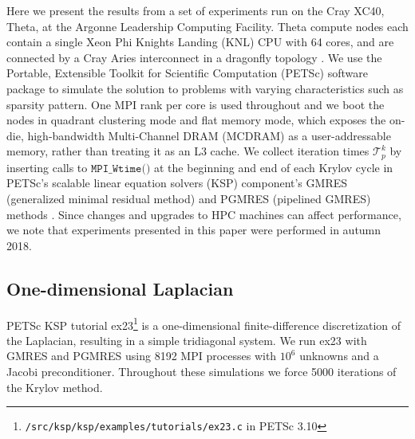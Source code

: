 \documentclass[sigconf]{acmart}
\begin{document}
Here we present the results from a set of experiments run on the Cray XC40, Theta, at the Argonne Leadership Computing Facility. 
Theta compute nodes each contain a single Xeon Phi Knights Landing (KNL) CPU \cite{sodani2015knights} with 64 cores, and are connected by a Cray Aries interconnect in a dragonfly topology \cite{alverson2012cray}.
We use the Portable, Extensible Toolkit for Scientific Computation (PETSc) \cite{petsc-user-ref, petsc-web-page} software package to simulate the solution to problems with varying characteristics such as sparsity pattern. 
One MPI rank per core is used throughout and we boot the nodes in quadrant clustering mode and flat memory mode, which exposes the on-die, high-bandwidth Multi-Channel DRAM (MCDRAM) as a user-addressable memory, rather than treating it as an L3 cache.
We collect iteration times $\mathcal{T}^k_p$ by inserting calls to ${\texttt{MPI\_Wtime()}}$ at the beginning and end of each Krylov cycle in PETSc's scalable linear equation solvers (KSP) component's GMRES (generalized minimal residual method) and PGMRES (pipelined GMRES) methods \cite[Alg. 4]{GhyselsAshbyMeerbergenVanroose2013}. 
Since changes and upgrades to HPC machines can affect performance, we note that experiments presented in this paper were performed in autumn 2018. 


\subsection{One-dimensional Laplacian} \label{sec:ex23}
PETSc KSP tutorial ex23\footnote{\texttt{/src/ksp/ksp/examples/tutorials/ex23.c} in PETSc 3.10} is a one-dimensional finite-difference discretization of the Laplacian, resulting in a simple tridiagonal system. 
We run ex23 with GMRES and PGMRES using 8192 MPI processes with $10^6$ unknowns and a Jacobi preconditioner. 
Throughout these simulations we force 5000 iterations of the Krylov method.
\end{document}
